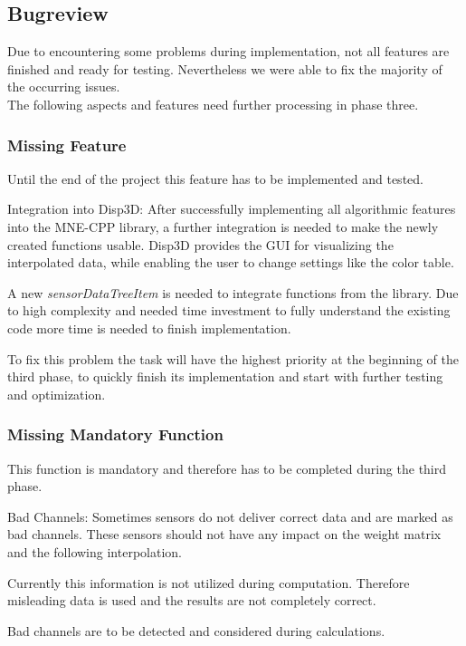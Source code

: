 \subsection{Bugreview}
Due to encountering some problems during implementation, not all features are finished and ready for testing.
Nevertheless we were able to fix the majority of the occurring issues. \\ 
The following aspects and features need further processing in phase three. 

\subsubsection{Missing Feature}
Until the end of the project this feature has to be implemented and tested.

\begin{aims}
	\item[\hspace*{11mm} Integration into Disp3D:] After successfully implementing all algorithmic features into the MNE-CPP library, a further integration is needed to make the newly created functions usable. Disp3D provides the GUI for visualizing the interpolated data, while enabling the user to change settings like the color table.
	
	A new \textit{sensorDataTreeItem} is needed to integrate functions from the library. Due to high complexity and needed time investment to fully understand the existing code more time is needed to finish implementation.
	
	To fix this problem the task will have the highest priority at the beginning of the third phase, to quickly finish its implementation and start with further testing and optimization. 
	
	
\end{aims}

\subsubsection{Missing Mandatory Function}
This function is mandatory and therefore has to be completed during the third phase.

\begin{aims}
	\item[\hspace*{11mm} Bad Channels:]Sometimes sensors do not deliver correct data and are marked as bad channels. These sensors should not have                          					   any impact on the weight matrix and the following interpolation. 
	
					   Currently this information is not utilized during computation. Therefore misleading data is used and the 							   results are not completely correct.  
					  
					   Bad channels are to be detected and considered during calculations. 
\end{aims}


